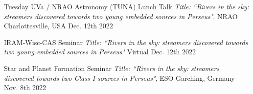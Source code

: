 


\begin{cvhonors}
	 \cvhonor
	{Tuesday UVa / NRAO Astronomy (TUNA) Lunch Talk} %
	{\textit{Title: ``Rivers in the sky: streamers discovered towards two young embedded sources in Perseus"}, NRAO} %
	{Charlottesville, USA} %
	{Dec. 12th 2022} %
	
	 \cvhonor
	{IRAM-Wisc-CAS Seminar} %
	{\textit{Title: ``Rivers in the sky: streamers discovered towards two young embedded sources in Perseus"}} %
	{Virtual} %
	{Dec. 12th 2022} %
	
	 \cvhonor
	{Star and Planet Formation Seminar} %
	{\textit{Title: ``Rivers in the sky: streamers discovered towards two Class I sources in Perseus"}, ESO} %
	{Garching, Germany} %
	{Nov. 8th 2022} %
	
\end{cvhonors}


